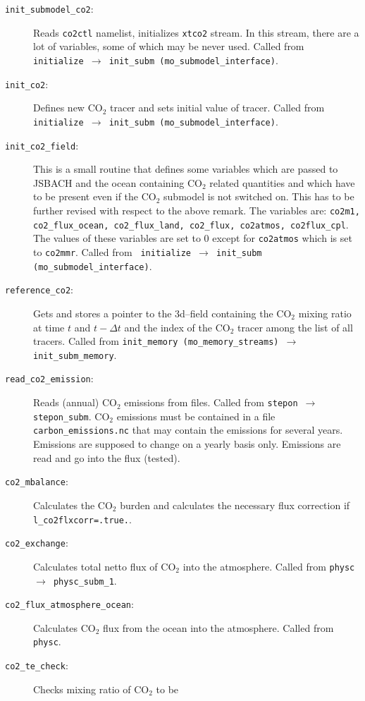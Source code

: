 \begin{appendix}
\begin{description}
\item[{\tt init\_submodel\_co2}:] Reads {\tt co2ctl} namelist,
  initializes {\tt xtco2} stream. In this stream, there are a lot of
  variables, some of which may be never used. Called from {\tt
    initialize $\rightarrow$ init\_subm (mo\_submodel\_interface)}.
\item[{\tt init\_co2}:] Defines new CO$_2$ tracer and sets initial
  value of tracer. Called from {\tt
    initialize $\rightarrow$ init\_subm \newline (mo\_submodel\_interface)}.
\item[{\tt init\_co2\_field}:] This is a small routine that defines
  some variables which are passed to JSBACH and the ocean containing
  CO$_2$ related quantities and which have to be present even if the
  CO$_2$ submodel is not switched on. This has to be further revised
  with respect to the above remark. The variables are: {\tt co2m1,
    co2\_flux\_ocean, co2\_flux\_land, co2\_flux, co2atmos,
    co2flux\_cpl}. The values of these variables are set to 0 except
  for {\tt co2atmos} which is set to {\tt co2mmr}. Called from {\tt
    initialize $\rightarrow$ init\_subm (mo\_submodel\_interface)}.
\item[{\tt reference\_co2}:] Gets and stores a
  pointer to the 3d--field containing the CO$_2$ mixing ratio at time
  $t$ and $t-\Delta t$ and the index of the CO$_2$ tracer among the
  list of all tracers. Called from {\tt init\_memory
    (mo\_memory\_streams) $\rightarrow$ init\_subm\_memory}. 
\item[{\tt read\_co2\_emission}:] Reads (annual) CO$_2$ emissions from
  files. Called from {\tt stepon $\rightarrow$ stepon\_subm}. CO$_2$
  emissions must be contained in a file {\tt carbon\_emissions.nc}
  that may contain the emissions for several years. Emissions are
  supposed to change on a yearly basis only. Emissions are read and go
  into the flux (tested). 
\item[{\tt co2\_mbalance}:] Calculates the CO$_2$ burden and calculates
  the necessary flux correction if {\tt l\_co2flxcorr=.true.}.
\item[{\tt co2\_exchange}:] Calculates total netto flux of CO$_2$ into
  the atmosphere. Called from {\tt physc $\rightarrow$ physc\_subm\_1}.
\item [{\tt co2\_flux\_atmosphere\_ocean}:] Calculates CO$_2$ flux from
  the ocean into the atmosphere. Called from {\tt physc}.
\item [{\tt co2\_te\_check}:] Checks mixing ratio of CO$_2$ to be

\end{description}
\end{appendix}
